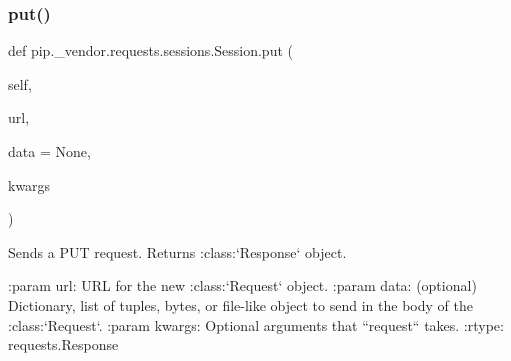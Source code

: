 \subsubsection{\texorpdfstring{put()}{put()}}
{\footnotesize\ttfamily def pip.\+\_\+vendor.\+requests.\+sessions.\+Session.\+put (\begin{DoxyParamCaption}\item[{}]{self,  }\item[{}]{url,  }\item[{}]{data = {\ttfamily None},  }\item[{}]{kwargs }\end{DoxyParamCaption})}

\begin{DoxyVerb}Sends a PUT request. Returns :class:`Response` object.

:param url: URL for the new :class:`Request` object.
:param data: (optional) Dictionary, list of tuples, bytes, or file-like
    object to send in the body of the :class:`Request`.
:param \*\*kwargs: Optional arguments that ``request`` takes.
:rtype: requests.Response
\end{DoxyVerb}
 \mbox{\label{classpip_1_1__vendor_1_1requests_1_1sessions_1_1Session_a718b60e99280c6ef1a346cb6dc0a90c8}} 
